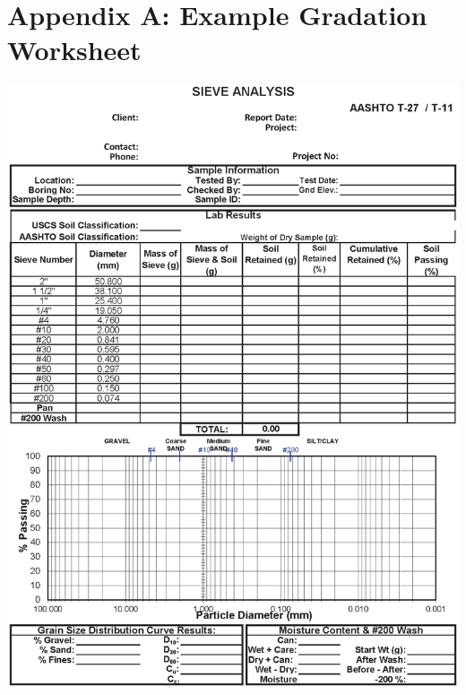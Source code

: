 \documentclass[12pt]{article}
\begin{document}
\section*{Appendix A: Example Gradation Worksheet}
\label{AppendixA}
\begin{center}
    \includegraphics[width=1\linewidth]{Example_Sieve_Analysis_Worksheet.eps}
\end{center}

\end{document}
